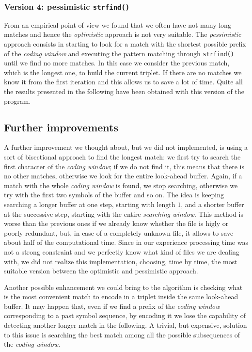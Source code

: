 \subsubsection{Version 4: pessimistic \texttt{strfind()}} \label{subsubsec:pess}
From an empirical point of view we found that we often have not many long matches and hence the \textit{optimistic} approach is not very suitable. The \textit{pessimistic} approach consists in starting to look for a match with the shortest possible prefix of the \textit{coding window} and executing the pattern matching through \texttt{strfind()} until we find no more matches. In this case we consider the previous match, which is the longest one, to build the current triplet. If there are no matches we know it from the first iteration and this allows us to save a lot of time. Quite all the results presented in the following have been obtained with this version of the program.
\\

\subsection{Further improvements}
A further improvement we thought about, but we did not implemented, is using a sort of bisectional approach to find the longest match: we first try to search the first character of the \textit{coding window}; if we do not find it, this means that there is no other matches, otherwise we look for the entire look-ahead buffer. Again, if a match with the whole \textit{coding window} is found, we stop searching, otherwise we try with the first two symbols of the buffer and so on. The idea is keeping searching a longer buffer at one step, starting with length $1$, and a shorter buffer at the successive step, starting with the entire \textit{searching window}. This method is worse than the previous ones if we already know whether the file is higly or poorly redundant, but, in case of a completely unknown file, it allows to save about half of the computational time. Since in our experience processing time was not a strong constraint and we perfectly know what kind of files we are dealing with, we did not realize this implementation, choosing, time by time, the most suitable version between the optimistic and pessimistic approach.

Another possible enhancement we could bring to the algorithm is checking what is the most convenient match to encode in a triplet inside the same look-ahead buffer. It may happen that, even if we find a prefix of the \textit{coding window} corresponding to a past symbol sequence, by encoding it we lose the capability of detecting another longer match in the following. A trivial, but expensive, solution to this issue is searching the best match among all the possible subsequences of the \textit{coding window}.